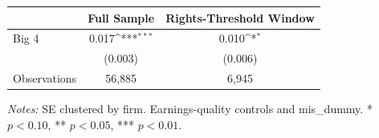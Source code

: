 \documentclass[10pt]{article}
\newcommand{\sym}[1]{\textsuperscript{#1}}
\begin{document}
\begin{minipage}{19cm}\fontsize{10}{12}\selectfont\setlength{\tabcolsep}{4pt}\renewcommand{\arraystretch}{1.15}


\def\sym#1{\ifmmode^{#1}\else\(^{#1}\)\fi}
\centering
{}
\label{tab:big4-inventory-impairment}
\begin{threeparttable}
\begin{tabular}{l c c }
\toprule
 & Full Sample & Rights-Threshold Window \\
\midrule
Big 4 & 0.017\sym{***} & 0.010\sym{*} \\
 & (0.003) & (0.006) \\
Observations & 56,885 & 6,945 \\
\bottomrule
\end{tabular}
\begin{tablenotes}\fontsize{9}{11}\selectfont
\item \raggedright \fontsize{9}{11}\selectfont \textit{Notes:} SE clustered by firm. Earnings-quality controls and mis\_dummy. * $p<0.10$, ** $p<0.05$, *** $p<0.01$.
\end{tablenotes}
\end{threeparttable}

\end{minipage}
\end{document}
